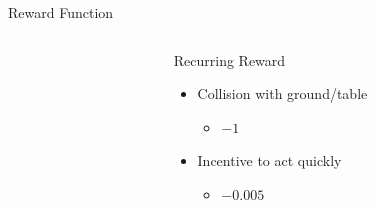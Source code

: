 \begin{frame}{Reward Function}{}
\begin{columns}
\begin{column}{0.5\textwidth}
        \end{column}
        \begin{column}{0.5\textwidth}%
            \begin{block}{Recurring Reward}
                \begin{itemize}
                    \item Collision with ground/table
                          \begin{itemize}
                              \item \(-1\)
                          \end{itemize}
                    \item Incentive to act quickly
                          \begin{itemize}
                              \item \(-0.005\)
                          \end{itemize}
                \end{itemize}
            \end{block}
        \end{column}
    \end{columns}
\end{frame}

